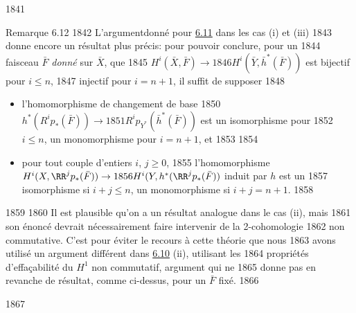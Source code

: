   1841	\begin{enonce*}[remark]{Remarque 6.12}
  1842	L'argument\pageoriginale donné pour \hyperref[XII.prop6.11]{6.11} dans les cas (i) et (iii)
  1843	donne encore un résultat plus précis: pour pouvoir conclure, pour un
  1844	faisceau $\bar{F}$ \emph{donné} sur $\bar{X}$, que
  1845	$H^{i}(\bar{X},\bar{F})\rightarrow
  1846	H^{i}(\bar{Y},\bar{h}^{\ast}(\bar{F}))$ est bijectif pour $i\leq n$,
  1847	injectif pour $i=n+1$, il suffit de supposer
  1848	\begin{itemize}
  1849	\item[$1^{\circ}$)] l'homomorphisme de changement de base
  1850	$h^{\ast}(R^{i}p_{\ast}(\bar{F}))\rightarrow
  1851	R^{i}p_{Y^{\ast}}(\bar{h}^{\ast}(\bar{F}))$ est un isomorphisme pour
  1852	$i\leq n$, un monomorphisme pour $i=n+1$, et
  1853	
  1854	\item[$2^{\circ}$)] pour tout couple d'entiers $i$, $j\geq 0$,
  1855	l'homomorphisme $H^{i}(X,\RR^jp_{\ast}(\bar{F}))\rightarrow
  1856	H^{i}(Y,h^{\ast}(\RR^jp_{\ast}(\bar{F}))$ induit par $h$ est un
  1857	isomorphisme si $i+j\leq n$, un monomorphisme si $i+j=n+1$.
  1858	\end{itemize}
  1859	
  1860	Il est plausible qu'on a un résultat analogue dans le cas (ii), mais
  1861	son énoncé devrait nécessairement faire intervenir de la 2-cohomologie
  1862	non commutative. C'est pour éviter le recours à cette théorie que nous
  1863	avons utilisé un argument différent dans \hyperref[XII.cor6.10]{6.10} (ii), utilisant les
  1864	propriétés d'effaçabilité du $H^1$ non commutatif, argument qui ne
  1865	donne pas en revanche de résultat, comme ci-dessus, pour un $\bar{F}$ fixé.
  1866	\end{enonce*}
  1867	

